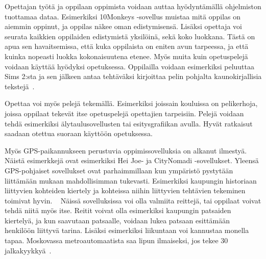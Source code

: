 \documentclass[utf8,bachelor]{gradu3}
\begin{document}
Opettajan työtä ja oppilaan oppimista voidaan auttaa hyödyntämällä ohjelmiston tuottamaa dataa. Esimerkiksi 10Monkeys -sovellus muistaa mitä oppilas on aiemmin oppinut, ja oppilas näkee oman edistymisensä. Lisäksi opettaja voi seurata kaikkien oppilaiden edistymistä yksilöinä, sekä koko luokkana. Tästä on apua sen havaitsemissa, että kuka oppilaista on eniten avun tarpeessa, ja että kuinka nopeasti luokka kokonaisuutena etenee.
Myös muita kuin opetuspelejä voidaan käyttää hyödyksi opetuksessa. Oppilailla voidaan esimerkiksi peluuttaa Sims 2:sta ja sen jälkeen antaa tehtäväksi kirjoittaa pelin pohjalta kaunokirjallisia tekstejä~\parencite[][41-43]{laatua}.

Opettaa voi myös pelejä tekemällä. Esimerkiksi joissain kouluissa on pelikerhoja, joissa oppilaat tekevät itse opetuspelejä opettajien tarpeisiin. Pelejä voidaan tehdä esimerkiksi älytaulusovellusten tai esitysgrafiikan avulla. Hyvät ratkaisut saadaan otettua suoraan käyttöön opetuksessa. ~\parencite[][]{peleja}

Myös GPS-paikannukseen perustuvia oppimissovelluksia on alkanut ilmestyä. Näistä esimerkkejä ovat esimerkiksi Hei Joe- ja CityNomadi -sovellukset. Yleensä GPS-pohjaiset sovellukset ovat parhaimmillaan kun ympäristö pystytään liittämään mukaan mahdollisimman tukevasti. Esimerkiksi kaupungin historiaan liittyvien kohteiden kiertely ja kohteissa niihin liittyvien tehtävien tekeminen toimivat hyvin. ~\parencite[][]{heijoe} Näissä sovelluksissa voi olla valmiita reittejä, tai oppilaat voivat tehdä niitä myös itse. Reitit voivat olla esimerkiksi kaupungin patsaiden kiertelyä, ja kun saavutaan patsaalle, voidaan lukea patsaan esittämään henkilöön liittyvä tarina. Lisäksi esimerkiksi liikuntaan voi kannustaa monella tapaa. Moskovassa metroautomaatista saa lipun ilmaiseksi, jos tekee 30 jalkakyykkyä~\parencite[][]{kyykky}.
\end{document}
